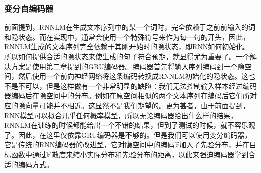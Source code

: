 \documentclass[]{template}
\begin{document}
\subsubsection{变分自编码器}
前面提到，RNNLM在生成文本序列中的某一个词时，完全依赖于之前前输入的词和隐状态。而在实现中，通常会使用一个特殊符号来作为每一句的开头，因此，RNNLM生成的文本序列完全依赖于其刚开始时的隐状态，即RNN如何初始化。所以如何提供合适的隐状态来使生成的句子符合预期，就显得尤为重要了。一个解决方案是使用第二章提到的GRU编码器。编码器首先将输入序列编码到一个隐空间，然后使用一个前向神经网络将这条编码转换成RNNLM初始化的隐状态。这也不是不可以，但是这样做有一个非常明显的缺陷：我们无法控制输入样本经过编码器编码后在隐空间中的分布。例如在原空间相似的两个文本序列在编码后它们所对应的隐向量可能并不相近。这显然不是我们期望的。更为甚者，由于前面提到，RNN模型可以拟合几乎任何概率模型，所以无论编码器给出什么样的结果，RNNLM在训练的时候都能给出一个不错的结果，但到了测试的时候，就不容乐观了。因此，在这里仅依靠GRU编码器是不够的。但是我们可以使用变分编码器，它是传统的RNN编码器的改进型，它对隐空间中的编码\(\overrightarrow{z}\)加入了先验分布，并在目标函数中通过kl散度来缩小实际分布和先验分布的距离，以此来强迫编码器学到合适的编码方式。
\end{document}

